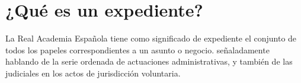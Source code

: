 \section{¿Qué es un expediente?}

La Real Academia Española tiene como significado de expediente el conjunto de todos los papeles correspondientes a un asunto o negocio. señaladamente hablando de la serie ordenada de actuaciones administrativas, y también de las judiciales en los actos de jurisdicción voluntaria. \cite{expediente}
